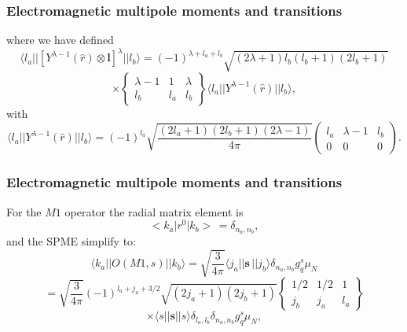 \documentclass{beamer}
\begin{document}
\begin{frame}
\frametitle{Electromagnetic multipole moments and transitions}

\begin{block}{}
where we have defined
\[
\langle l _{a}\vert\vert [Y^{\lambda -1}(\hat{r})\otimes\mathbf{l}]^{\lambda }\vert\vert l _{b}\rangle=(-1)^{\lambda +l _{a}+l _{b}} \sqrt{(2\lambda +1)l _{b}(l _{b}+1)(2l _{b}+1)}
\]
\[
\times\left\{\begin{array}{ccc}  {\lambda -1} & {1}&  {\lambda}\\   {l _{b}}&  {l _{a}} &  {l _{b}} \end{array}\right\}
\langle l _{a}\vert\vert Y^{\lambda -1}(\hat{r})\vert\vert l _{b}\rangle,
\]
with
\[
\langle l _{a}\vert\vert Y^{\lambda -1}(\hat{r})\vert\vert l _{b}\rangle=(-1)^{l _{a}} \sqrt{\frac{(2l _{a}+1)(2l _{b}+1)(2\lambda -1)}{4\pi }}\left(\begin{array}{ccc}  {l _{a}} & {\lambda -1} & {l _{b}}\\  {0} & {0}&  {0}\end{array}\right)
. 
\]
\end{block}
\end{frame}

\begin{frame}
\frametitle{Electromagnetic multipole moments and transitions}

\begin{block}{}
For the $M1$ operator the radial matrix element is
\[
<k_{a}\vert r^{0}\vert k_{b}>\, = \delta _{n_{a},n_{b}},
\]
and the SPME simplify to:
\[
\langle k_{a}\vert\vert O(M1,s)\vert\vert k_{b}\rangle=\sqrt{ \frac{3}{4\pi }}\langle j_{a}\vert\vert \mathbf{s}\,\vert\vert j_{b}\rangle \delta _{n_{a},n_{b}}g^{s}_{q}\mu_{N}
\]
\[
=\sqrt{ \frac{3}{4\pi }}(-1)^{l _{a}+j_{a}+3/2}
\sqrt{(2j_{a}+1)(2j_{b}+1)}\left\{\begin{array}{ccc}  {1/2}&  {1/2} & {1} \\ {j_{b}} & {j_{a}}&  {l _{a}}\end{array}\right\}
\]
\[
\times\langle s\vert\vert \mathbf{s}\vert\vert s\rangle \delta _{l _{a},l _{b}} \delta _{n_{a},n_{b}}g^{s}_{q}\mu _{N},
\]
\end{block}
\end{frame}
\end{document}
